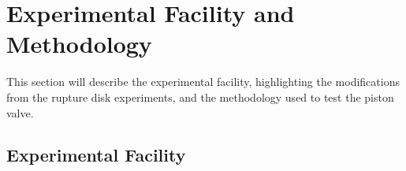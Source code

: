 \section{Experimental Facility and Methodology} \label{s:experiment}

This section will describe the experimental facility, highlighting the modifications from the rupture disk experiments, and the methodology used to test the piston valve.



\subsection{Experimental Facility} \label{ss:facility}

